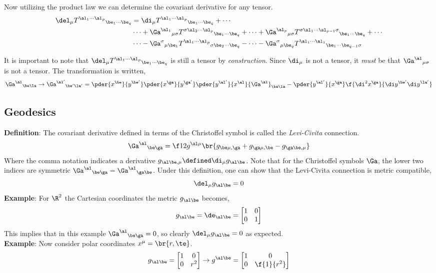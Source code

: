 \documentclass{article}
\newcommand{\mtrx}[1]{
    \begin{bmatrix}
    #1
    \end{bmatrix}
}
\begin{document}
Now utilizing the product law we can determine the covariant derivative for any tensor.
\begin{align*}
\del_\mu {T^{\al_1 \cdots \al_p}}_{\be_1\cdots\be_q} &= \di_\mu {T^{\al_1 \cdots \al_p}}_{\be_1\cdots\be_q} + \cdots \\
 &\cdots + {\Ga^{\al_1}}_{\mu\sigma}{T^{\sigma \al_2 \cdots \al_p}}_{\be_1\cdots\be_q} + \cdots + {\Ga^{\al_p}}_{\mu\sigma}{T^{\sigma \al_1 \cdots \al_{p-1} \sigma}}_{\be_1\cdots\be_q} + \cdots \\
 &\cdots - {\Ga^{\sigma}}_{\mu\be_1}{T^{\al_1 \cdots \al_p}}_{\sigma\be_2\cdots\be_q} - \cdots - {\Ga^{\sigma}}_{\mu\be_q}{T^{\al_1 \cdots \al_1}}_{\be_1\cdots\be_{q-1}\sigma} \\
\end{align*}

It is important to note that $\del_\mu {T^{\al_1 \cdots \al_p}}_{\be_1\cdots\be_q}$ is still a tensor by \textit{construction}. Since $\di_\mu$ is not a tensor, it \textit{must} be that ${\Ga^\al}_{\mu\sigma}$ is not a tensor. The transformation is written, \\
\[ {\Ga^\al}_{\be\la} \to {\Ga^{\al'}}_{\be'\la'} = \pder{x^\be}{y^{\be'}}\pder{x^\ga}{y^{\ga'}}\pder{y^{\al'}}{x^{\al}} {\Ga^\al}_{\be\la} - \pder{y^{\al'}}{x^{\ga}}\f{\di^2 x^{\ga}}{\di y^{\be'}\di y^{\la'}}  \]

\subsection{Geodesics}

\textbf{Definition}: The covariant derivative defined in terms of the Christoffel symbol is called the \textit{Levi-Civita} connection.
\[ {\Ga^\al}_{\be\ga} = \f12 g^{\al\mu}\br{g_{\be\mu,\ga} + g_{\ga\mu,\be} - g_{\ga\be,\mu}} \]
Where the comma notation indicates a derivative $g_{\al\be,\mu} \defined \di_\mu g_{\al\be}$. Note that for the Christoffel symbols $\Ga$, the lower two indices are symmetric ${\Ga^\al}_{\be\ga} = {\Ga^\al}_{\ga\be}$. Under this definition, one can show that the Levi-Civita connection is metric compatible,
\[ \del_\mu g_{\al\be} = 0 \]
\textbf{Example}: For $\R^2$ the Cartesian coordinates the metric $g_{\al\be}$ becomes,
\[ g_{\al\be}  = \de_{\al\be} = \mtrx{1 & 0 \\ 0 & 1} \]
This implies that in this example ${\Ga^\al}_{\be\ga} = 0$, so clearly $\del_\mu g_{\al\be} = 0$ as expected.\\

\textbf{Example}: Now consider polar coordinates $x^\mu = \br{r ,\te}$.
\[ g_{\al\be} = \mtrx{1 & 0 \\ 0 & r^2} \to g^{\al\be} = \mtrx{1 & 0 \\ 0 & \f{1}{r^2}} \]
\end{document}
